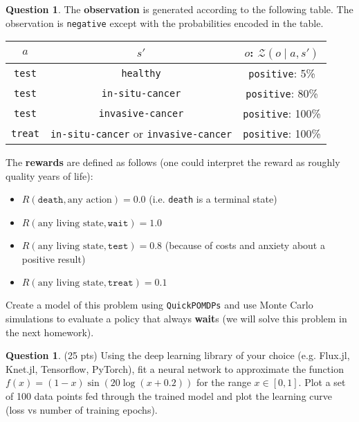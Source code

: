 \documentclass{article}
\theoremstyle{definition}
\newtheorem{question}[thm]{Question}
\newcommand{\ttt}[1]{\texttt{#1}}
\begin{document}
\begin{question}
The \textbf{observation} is generated according to the following table. The observation is \ttt{negative} except with the probabilities encoded in the table.
\begin{center}
    \begin{tabular}{ccc}
    \toprule
    $a$ & $s'$ & $o$: $\mathcal{Z}(o \mid a, s')$ \\
    \midrule
    \texttt{test} & \texttt{healthy} & \texttt{positive}: 5\% \\
    \texttt{test} & \texttt{in-situ-cancer} & \texttt{positive}: 80\% \\
    \texttt{test} & \texttt{invasive-cancer} & \texttt{positive}: 100\% \\
    \texttt{treat} & \ttt{in-situ-cancer} or \texttt{invasive-cancer} & \texttt{positive}: 100\% \\
    \bottomrule
    \end{tabular}
\end{center}

The \textbf{rewards} are defined as follows (one could interpret the reward as roughly quality years of life):
\begin{itemize}[noitemsep]
    \item $R(\texttt{death}, \text{any action}) = 0.0$ (i.e. \texttt{death} is a terminal state)
    \item $R(\text{any living state}, \texttt{wait}) = 1.0$
    \item $R(\text{any living state}, \texttt{test}) = 0.8$ (because of costs and anxiety about a positive result)
    \item $R(\text{any living state}, \texttt{treat}) = 0.1$
\end{itemize}

Create a model of this problem using \texttt{QuickPOMDPs} and use Monte Carlo simulations to evaluate a policy that always \textbf{wait}s (we will solve this problem in the next homework).

\end{question}

\begin{question}
(25 pts) Using the deep learning library of your choice (e.g. Flux.jl, Knet.jl, Tensorflow, PyTorch), fit a neural network to approximate the function $f(x) = (1-x) \sin(20 \log(x+0.2))$ for the range $x \in [0,1]$. Plot a set of 100 data points fed through the trained model and plot the learning curve (loss vs number of training epochs).
\end{question}
\end{document}
